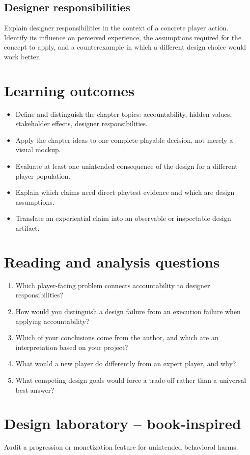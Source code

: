 \documentclass[11pt]{article}
\begin{document}
\subsection{Designer responsibilities}
Explain designer responsibilities in the context of a concrete player action. Identify its influence on perceived experience, the assumptions required for the concept to apply, and a counterexample in which a different design choice would work better.


\section{Learning outcomes}
\begin{itemize}
\item Define and distinguish the chapter topics: accountability, hidden values, stakeholder effects, designer responsibilities.
\item Apply the chapter ideas to one complete playable decision, not merely a visual mockup.
\item Evaluate at least one unintended consequence of the design for a different player population.
\item Explain which claims need direct playtest evidence and which are design assumptions.
\item Translate an experiential claim into an observable or inspectable design artifact.
\end{itemize}

\section{Reading and analysis questions}
\begin{enumerate}
\item Which player-facing problem connects accountability to designer responsibilities?
\item How would you distinguish a design failure from an execution failure when applying accountability?
\item Which of your conclusions come from the author, and which are an interpretation based on your project?
\item What would a new player do differently from an expert player, and why?
\item What competing design goals would force a trade-off rather than a universal best answer?
\end{enumerate}

\section{Design laboratory -- book-inspired}
Audit a progression or monetization feature for unintended behavioral harms.
\end{document}
